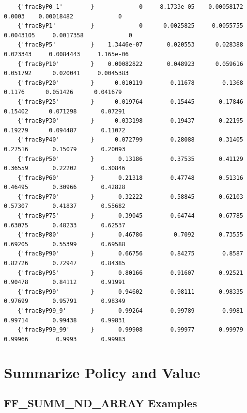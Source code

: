 \documentclass[
]{book}
\begin{document}
\begin{verbatim}
    {'fracByP0_1'        }             0     8.1733e-05    0.00058172        0.0003    0.00018482             0 
    {'fracByP1'          }             0      0.0025825     0.0055755     0.0043105     0.0017358             0 
    {'fracByP5'          }    1.3446e-07       0.020553      0.028388      0.023343     0.0084443     1.165e-06 
    {'fracByP10'         }    0.00082822       0.048923      0.059616      0.051792      0.020041     0.0045383 
    {'fracByP20'         }      0.010119        0.11678        0.1368        0.1176      0.051426      0.041679 
    {'fracByP25'         }      0.019764        0.15445       0.17846       0.15402      0.071298       0.07291 
    {'fracByP30'         }      0.033198        0.19437       0.22195       0.19279      0.094487       0.11072 
    {'fracByP40'         }      0.072799        0.28088       0.31405       0.27516       0.15079       0.20093 
    {'fracByP50'         }       0.13186        0.37535       0.41129       0.36559       0.22202       0.30846 
    {'fracByP60'         }       0.21318        0.47748       0.51316       0.46495       0.30966       0.42828 
    {'fracByP70'         }       0.32222        0.58845       0.62103       0.57307       0.41837       0.55682 
    {'fracByP75'         }       0.39045        0.64744       0.67785       0.63075       0.48233       0.62537 
    {'fracByP80'         }       0.46786         0.7092       0.73555       0.69205       0.55399       0.69588 
    {'fracByP90'         }       0.66756        0.84275        0.8587       0.82726       0.72947       0.84385 
    {'fracByP95'         }       0.80166        0.91607       0.92521       0.90478       0.84112       0.91991 
    {'fracByP99'         }       0.94602        0.98111       0.98335       0.97699       0.95791       0.98349 
    {'fracByP99_9'       }       0.99264        0.99789        0.9981       0.99714       0.99438       0.99831 
    {'fracByP99_99'      }       0.99908        0.99977       0.99979       0.99966        0.9993       0.99983 
\end{verbatim}

\hypertarget{summarize-policy-and-value}{%
\chapter{Summarize Policy and Value}\label{summarize-policy-and-value}}

\hypertarget{ff_summ_nd_array-examples}{%
\section{FF\_SUMM\_ND\_ARRAY Examples}\label{ff_summ_nd_array-examples}}
\end{document}

